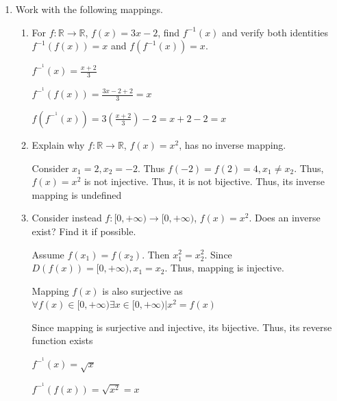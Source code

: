 \documentclass[12pt]{article}
\begin{document}
\begin{enumerate}
\begin{enumerate}
        $(g \circ f)(s)$ is not injective, as $g(f(s_1)) = g(f(s_2)) = pass, s_1 \not= s_2$
        $(g \circ f)(s)$ is surjective, as $\forall y \in CD(g(f(x)) \exists x \in D(g(f(x)) | g(f(x)) = y$
        
        \item Explain why \(f \circ g\) is not defined for these mappings.

        Assume mapping $f \circ g$ is defined. Then codomain Q of g must be a subset of domain S of f. However, $Q \not\subseteq S$. Contradiction found. Thus, mapping $f \circ g$ is not defined



    \end{enumerate}

    \item Work with the following mappings.
    \begin{enumerate}
        \item For \(f : \mathbb{R} \to \mathbb{R}\), \(f(x) = 3x-2\), find \(f^{-1}(x)\) and verify both identities \(f^{-1}(f(x)) = x\) and \(f(f^{-1}(x)) = x\).

        $f^-^1(x) = \frac{x+2}{3}$

        $f^-^1(f(x)) = \frac{3x-2+2}{3} = x$

        $f(f^-^1(x)) = 3(\frac{x+2}{3}) - 2 = x +2-2 = x$

        
        \item Explain why \(f : \mathbb{R} \to \mathbb{R}\), \(f(x) = x^2\), has no inverse mapping.

        Consider $x_1 = 2, x_2 = -2$. Thus $f(-2) = f(2) = 4, x_1 \not = x_2$. Thus, $f(x) = x^2$ is not injective. Thus, it is not bijective. Thus, its inverse mapping is undefined

        \item Consider instead \(f : [0, +\infty) \to [0, +\infty)\), \(f(x) = x^2\). Does an inverse exist? Find it if possible.

        Assume $f(x_1) = f(x_2)$. Then $x_1^2 = x_2^2$. Since $D(f(x)) = [0, +\infty), x_1 = x_2$. Thus, mapping is injective.

        Mapping $f(x)$ is also surjective as $\forall f(x) \in [0, +\infty) \exists x \in [0, +\infty) | x^2 = f(x)$

        Since mapping is surjective and injective, its bijective. Thus, its reverse function exists

        $f^-^1(x) = \sqrt{x}$

        $f^-^1(f(x)) = \sqrt{x^2} = x$


\end{enumerate}
\end{enumerate}
\end{document}
